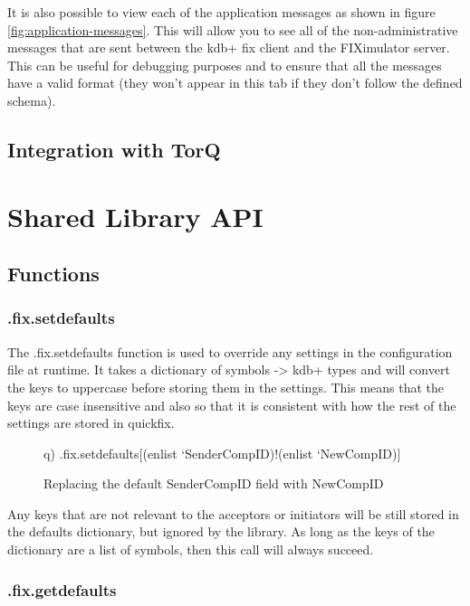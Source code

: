 It is also possible to view each of the application messages as shown in figure \ref{fig:application-messages}. This will allow you to see all of the non-administrative messages
that are sent between the kdb+ fix client and the FIXimulator server. This can be useful for debugging
purposes and to ensure that all the messages have a valid format (they won't appear in this tab if they
don't follow the defined schema).

\section{Integration with TorQ}



\chapter{Shared Library API}
\section{Functions}

\subsection{.fix.setdefaults}
\label{func:setdefaults}

The .fix.setdefaults function is used to override any settings in the configuration file at runtime. It takes a dictionary of symbols -> kdb+ types and will convert the keys to uppercase before storing them in the settings. This means that the keys are case insensitive and also so that it is consistent with how the rest of the settings are stored in quickfix.

\begin{figure}[H]
\begin{qcode}
q) .fix.setdefaults[(enlist `SenderCompID)!(enlist `NewCompID)]
\end{qcode}
\caption{Replacing the default SenderCompID field with NewCompID}
\end{figure}

Any keys that are not relevant to the acceptors or initiators will be still stored in
the defaults dictionary, but ignored by the library. As long as the keys of the dictionary are a list of symbols, then this call will always succeed. 

\subsection{.fix.getdefaults}
\label{func:getdefaults}

